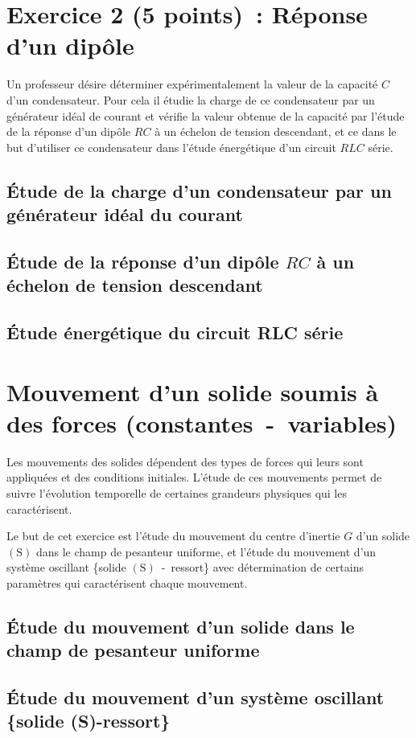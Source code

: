 \section*{Exercice 2 (5 points)~: Réponse d'un dipôle}
Un professeur désire déterminer expérimentalement la valeur de la capacité $C$
d'un condensateur. Pour cela il étudie la charge de ce condensateur par un
générateur idéal de courant et vérifie la valeur obtenue de la capacité par
l'étude de la réponse d'un dipôle $R C$ à un échelon de tension descendant, et
ce dans le but d'utiliser ce condensateur dans l'étude énergétique d'un circuit
$R L C$ série.

\subsection{Étude de la charge d'un condensateur par un générateur idéal du
courant}


\subsection{Étude de la réponse d'un dipôle $R C$ à un échelon de tension
descendant}


\subsection{Étude énergétique du circuit RLC série}


\section{Mouvement d'un solide soumis à des forces (constantes~-~variables)}
Les mouvements des solides dépendent des types de forces qui leurs sont
appliquées et des conditions initiales. L'étude de ces mouvements permet de
suivre l'évolution temporelle de certaines grandeurs physiques qui les
caractérisent.

Le but de cet exercice est l'étude du mouvement du centre d'inertie $G$ d'un
solide $\mathrm{(S)}$ dans le champ de pesanteur uniforme, et l'étude du
mouvement d'un système oscillant \{solide $\mathrm{(S)}$~-~ressort\} avec
détermination de certains paramètres qui caractérisent chaque mouvement.

\subsection{Étude du mouvement d'un solide dans le champ de pesanteur uniforme}


\subsection{Étude du mouvement d'un système oscillant \{solide (S)-ressort\}}



